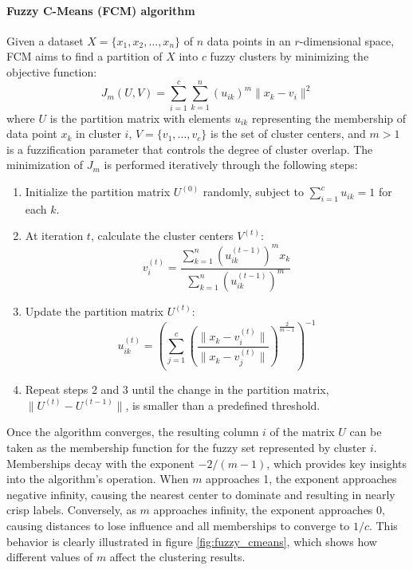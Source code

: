 \paragraph{Fuzzy C-Means (FCM) algorithm} Given a dataset $X = \{x_1, x_2, \ldots, x_n\}$ of $n$ data points in an $r$-dimensional space, FCM aims to find a partition of $X$ into $c$ fuzzy clusters by minimizing the objective function:
\[
J_m(U, V) = \sum_{i=1}^{c} \sum_{k=1}^{n} (u_{ik})^m \|x_k - v_i\|^2
\]
where $U$ is the partition matrix with elements $u_{ik}$ representing the membership of data point $x_k$ in cluster $i$, $V = \{v_1, \ldots, v_c\}$ is the set of cluster centers, and $m > 1$ is a fuzzification parameter that controls the degree of cluster overlap. The minimization of $J_m$ is performed iteratively through the following steps:
\begin{enumerate}
    \item Initialize the partition matrix $U^{(0)}$ randomly, subject to $\sum_{i=1}^{c} u_{ik} = 1$ for each $k$.
    \item At iteration $t$, calculate the cluster centers $V^{(t)}$:
    \[
    v_i^{(t)} = \frac{\sum_{k=1}^{n} (u_{ik}^{(t-1)})^m x_k}{\sum_{k=1}^{n} (u_{ik}^{(t-1)})^m}
    \]
    \item Update the partition matrix $U^{(t)}$:
    \[
    u_{ik}^{(t)} = \left( \sum_{j=1}^{c} \left( \frac{\|x_k - v_i^{(t)}\|}{\|x_k - v_j^{(t)}\|} \right)^{\frac{2}{m-1}} \right)^{-1}
    \]
    \item Repeat steps 2 and 3 until the change in the partition matrix, $\|U^{(t)} - U^{(t-1)}\|$, is smaller than a predefined threshold.
\end{enumerate}
Once the algorithm converges, the resulting column $i$ of the matrix $U$ can be taken as the membership function for the fuzzy set represented by cluster $i$.\\

Memberships decay with the exponent ${-2/(m-1)}$, which provides key insights into the algorithm's operation. When $m$ approaches 1, the exponent approaches negative infinity, causing the nearest center to dominate and resulting in nearly crisp labels. Conversely, as $m$ approaches infinity, the exponent approaches 0, causing distances to lose influence and all memberships to converge to $1/c$. This behavior is clearly illustrated in figure \ref{fig:fuzzy_cmeans}, which shows how different values of $m$ affect the clustering results.

